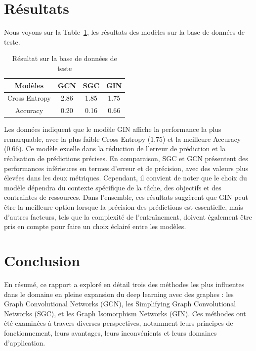 \documentclass[a4paper]{article}
\begin{document}
\section{Résultats}

Nous voyons sur la Table~\ref{tab:test}, les résultats des modèles sur la base de données de teste. 

\begin{table}[ht]
    \centering
    \begin{tabular}{|c|c|c|c|}
        \hline
        Modèles & GCN & SGC & GIN \\
        \hline
        Cross Entropy & 2.86 & 1.85 & 1.75 \\
        \hline
        Accuracy & 0.20 & 0.16 & 0.66\\
        \hline
    \end{tabular}
    \caption{Résultat sur la base de données de teste}
    \label{tab:test}
\end{table}

Les données indiquent que le modèle GIN affiche la performance la plus remarquable, avec la plus faible Cross Entropy (1.75) et la 
meilleure Accuracy (0.66). Ce modèle excelle dans la réduction de l'erreur de prédiction et la réalisation de prédictions précises.
En comparaison, SGC et GCN présentent des performances inférieures en termes d'erreur et de précision, avec des valeurs plus élevées
dans les deux métriques. Cependant, il convient de noter que le choix du modèle dépendra du contexte spécifique de la tâche, des 
objectifs et des contraintes de ressources. Dans l'ensemble, ces résultats suggèrent que GIN peut être la meilleure option lorsque 
la précision des prédictions est essentielle, mais d'autres facteurs, tels que la complexité de l'entraînement, doivent également
être pris en compte pour faire un choix éclairé entre les modèles.

\section{Conclusion}
En résumé, ce rapport a exploré en détail trois des méthodes les plus influentes dans le domaine en pleine expansion du deep learning 
avec des graphes : les Graph Convolutional Networks (GCN), les Simplifying Graph Convolutional Networks (SGC), et les Graph Isomorphism
Networks (GIN). Ces méthodes ont été examinées à travers diverses perspectives, notamment leurs principes de fonctionnement, leurs
avantages, leurs inconvénients et leurs domaines d'application.
\end{document}
